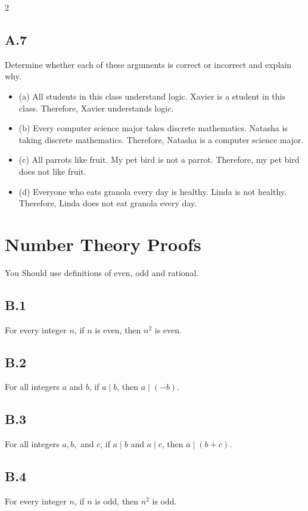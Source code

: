 \documentclass[9pt]{article}
\begin{document}
\begin{multicols}{2}
\subsection*{A.7}
Determine whether each of these arguments is correct or incorrect and explain why.
\begin{itemize}
  \item (a) All students in this class understand logic. Xavier is a student in this class. Therefore, Xavier understands logic.
  \item (b) Every computer science major takes discrete mathematics. Natasha is taking discrete mathematics. Therefore, Natasha is a computer science major.
  \item (c) All parrots like fruit. My pet bird is not a parrot. Therefore, my pet bird does not like fruit.
  \item (d) Everyone who eats granola every day is healthy. Linda is not healthy. Therefore, Linda does not eat granola every day.
\end{itemize}



\section*{Number Theory Proofs}
You Should use definitions of even, odd and rational.

\subsection*{B.1} For every integer \( n \), if \( n \) is even, then \( n^2 \) is even.

\subsection*{B.2}  For all integers \( a \) and \( b \), if \( a \mid b \), then \( a \mid (-b) \).

\subsection*{B.3}  For all integers \( a, b, \) and \( c \), if \( a \mid b \) and \( a \mid c \), then \( a \mid (b + c) \).

\subsection*{B.4}  For every integer \( n \), if \( n \) is odd, then \( n^2 \) is odd.


\end{multicols}
\end{document}
